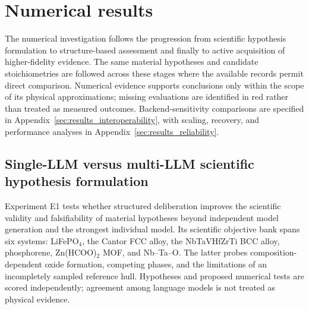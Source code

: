 \documentclass[11pt,a4paper]{article}
\begin{document}
\section{Numerical results}
\label{sec:numerical_results}
The numerical investigation follows the progression from scientific hypothesis formulation to structure-based assessment and finally to active acquisition of higher-fidelity evidence. The same material hypotheses and candidate stoichiometries are followed across these stages where the available records permit direct comparison. Numerical evidence supports conclusions only within the scope of its physical approximations; missing evaluations are identified in red rather than treated as measured outcomes. Backend-sensitivity comparisons are specified in Appendix~\ref{sec:results_interoperability}, with scaling, recovery, and performance analyses in Appendix~\ref{sec:results_reliability}.

\subsection{Single-LLM versus multi-LLM scientific hypothesis formulation}
\label{sec:results_llm}
Experiment E1 tests whether structured deliberation improves the scientific validity and falsifiability of material hypotheses beyond independent model generation and the strongest individual model. Its scientific objective bank spans six systems: LiFePO$_4$, the Cantor FCC alloy, the NbTaVHfZrTi BCC alloy, phosphorene, Zn(HCOO)$_2$ MOF, and Nb--Ta--O. The latter probes composition-dependent oxide formation, competing phases, and the limitations of an incompletely sampled reference hull. Hypotheses and proposed numerical tests are scored independently; agreement among language models is not treated as physical evidence.
\end{document}
